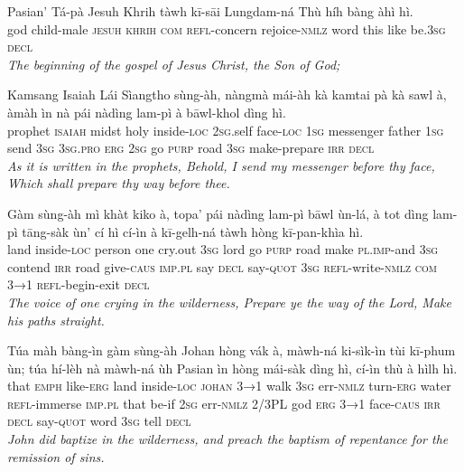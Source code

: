\documentclass[11pt,a4paper]{article}
\begin{document}
\begin{exe}
\gll Pasian' Tá-pà Jesuh Khrih tàwh kī-sāi Lungdam-ná Thù híh bàng àhì hì. \\
     god child-male \textsc{jesuh} \textsc{khrih} \textsc{com} \textsc{refl}-concern rejoice-\textsc{nmlz} word this like be.\textsc{3sg} \textsc{decl} \\
\glt \textcolor{kjvcolor}{\textit{The beginning of the gospel of Jesus Christ, the Son of God;}}

\gll Kamsang Isaiah Lái Sìangtho sùng-àh, nàngmà mái-àh kà kamtai pà kà sawl à, àmàh ìn nà pái nàdìng lam-pì à bāwl-khol dìng hì. \\
     prophet \textsc{isaiah} midst holy inside-\textsc{loc} \textsc{2sg}.self face-\textsc{loc} \textsc{1sg} messenger father \textsc{1sg} send \textsc{3sg} \textsc{3sg}.\textsc{pro} \textsc{erg} \textsc{2sg} go \textsc{purp} road \textsc{3sg} make-prepare \textsc{irr} \textsc{decl} \\
\glt \textcolor{kjvcolor}{\textit{As it is written in the prophets, Behold, I send my messenger before thy face, Which shall prepare thy way before thee.}}

\gll Gàm sùng-àh mì khàt kiko à, topa' pái nàdìng lam-pì bāwl ùn-lá, à tot dìng lam-pì tāng-sàk ùn' cí hì cí-ìn à kī-gelh-ná tàwh hòng kī-pan-khìa hì. \\
     land inside-\textsc{loc} person one cry.out \textsc{3sg} lord go \textsc{purp} road make \textsc{pl}.\textsc{imp}-and \textsc{3sg} contend \textsc{irr} road give-\textsc{caus} \textsc{imp}.\textsc{pl} say \textsc{decl} say-\textsc{quot} \textsc{3sg} \textsc{refl}-write-\textsc{nmlz} \textsc{com} \textsc{3→1} \textsc{refl}-begin-exit \textsc{decl} \\
\glt \textcolor{kjvcolor}{\textit{The voice of one crying in the wilderness, Prepare ye the way of the Lord, Make his paths straight.}}

\gll Túa màh bàng-ìn gàm sùng-àh Johan hòng vák à, màwh-ná ki-sìk-ìn tùi kī-phum ùn; túa hí-lèh nà màwh-ná ùh Pasian ìn hòng mái-sàk dìng hì, cí-ìn thù à hìlh hì. \\
     that \textsc{emph} like-\textsc{erg} land inside-\textsc{loc} \textsc{johan} \textsc{3→1} walk \textsc{3sg} err-\textsc{nmlz} turn-\textsc{erg} water \textsc{refl}-immerse \textsc{imp}.\textsc{pl} that be-if \textsc{2sg} err-\textsc{nmlz} 2/3PL god \textsc{erg} \textsc{3→1} face-\textsc{caus} \textsc{irr} \textsc{decl} say-\textsc{quot} word \textsc{3sg} tell \textsc{decl} \\
\glt \textcolor{kjvcolor}{\textit{John did baptize in the wilderness, and preach the baptism of repentance for the remission of sins.}}


\end{exe}
\end{document}
